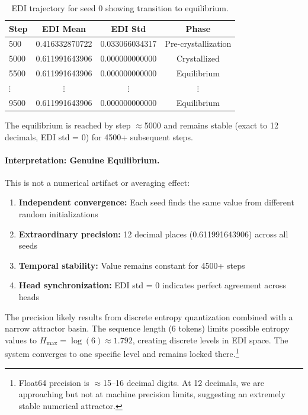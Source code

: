 \begin{table}[h]
\centering
\caption{EDI trajectory for seed 0 showing transition to equilibrium.}
\label{tab:edi-trajectory}
\begin{tabular}{lccc}
\toprule
Step & EDI Mean & EDI Std & Phase \\
\midrule
500 & 0.416332870722 & 0.033066034317 & Pre-crystallization \\
5000 & 0.611991643906 & 0.000000000000 & Crystallized \\
5500 & 0.611991643906 & 0.000000000000 & Equilibrium \\
$\vdots$ & $\vdots$ & $\vdots$ & $\vdots$ \\
9500 & 0.611991643906 & 0.000000000000 & Equilibrium \\
\bottomrule
\end{tabular}
\end{table}

The equilibrium is reached by step $\approx$5000 and remains stable (exact to 12 decimals, EDI std = 0) for 4500+ subsequent steps.

\paragraph{Interpretation: Genuine Equilibrium.}

This is not a numerical artifact or averaging effect:
\begin{enumerate}
\item \textbf{Independent convergence:} Each seed finds the same value from different random initializations
\item \textbf{Extraordinary precision:} 12 decimal places (0.611991643906) across all seeds
\item \textbf{Temporal stability:} Value remains constant for 4500+ steps
\item \textbf{Head synchronization:} EDI std = 0 indicates perfect agreement across heads
\end{enumerate}

The precision likely results from discrete entropy quantization combined with a narrow attractor basin. The sequence length (6 tokens) limits possible entropy values to $H_{\text{max}} = \log(6) \approx 1.792$, creating discrete levels in EDI space. The system converges to one specific level and remains locked there.\footnote{Float64 precision is $\approx$15--16 decimal digits. At 12 decimals, we are approaching but not at machine precision limits, suggesting an extremely stable numerical attractor.}


